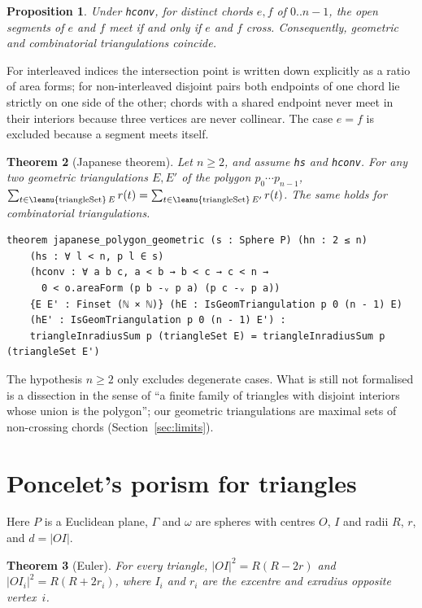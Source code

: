 \documentclass[11pt]{article}
\newtheorem{theorem}{Theorem}
\newtheorem{proposition}[theorem]{Proposition}
\theoremstyle{definition}
\theoremstyle{remark}
\DeclareRobustCommand\lean[1]{\ifmmode\text{\leanu{#1}}\else\leanu{#1}\fi}
\newcommand{\code}[1]{\texttt{#1}}
\begin{document}
\begin{proposition}\label{prop:cross}
Under \code{hconv}, for distinct chords $e,f$ of $0..n-1$, the open segments of $e$ and $f$ meet if and
only if $e$ and $f$ cross. Consequently, geometric and combinatorial triangulations coincide.
\end{proposition}

For interleaved indices the intersection point is written down explicitly as a ratio of area forms;
for non-interleaved disjoint pairs both endpoints of one chord lie strictly on one side of the
other; chords with a shared endpoint never meet in their interiors because three vertices are never
collinear. The case $e=f$ is excluded because a segment meets itself.

\begin{theorem}[Japanese theorem]\label{thm:japanese}
Let $n\ge2$, and assume \code{hs} and \code{hconv}. For any two geometric triangulations $E,E'$ of the
polygon $p_0\cdots p_{n-1}$,
$\sum_{t\in\lean{triangleSet}\,E}r(t)=\sum_{t\in\lean{triangleSet}\,E'}r(t)$. The same holds for
combinatorial triangulations.
\end{theorem}

\begin{lstlisting}
theorem japanese_polygon_geometric (s : Sphere P) (hn : 2 ≤ n)
    (hs : ∀ l < n, p l ∈ s)
    (hconv : ∀ a b c, a < b → b < c → c < n →
      0 < o.areaForm (p b -ᵥ p a) (p c -ᵥ p a))
    {E E' : Finset (ℕ × ℕ)} (hE : IsGeomTriangulation p 0 (n - 1) E)
    (hE' : IsGeomTriangulation p 0 (n - 1) E') :
    triangleInradiusSum p (triangleSet E) = triangleInradiusSum p (triangleSet E')
\end{lstlisting}

The hypothesis $n\ge2$ only excludes degenerate cases. What is still not formalised is a
dissection in the sense of ``a finite family of triangles with disjoint interiors whose union is the
polygon''; our geometric triangulations are maximal sets of non-crossing chords
(Section~\ref{sec:limits}).

\section{Poncelet's porism for triangles}\label{sec:poncelet}

Here $P$ is a Euclidean plane, $\Gamma$ and $\omega$ are spheres with centres $O$, $I$ and radii
$R$, $r$, and $d=|OI|$.

\begin{theorem}[Euler]\label{thm:euler}
For every triangle, $|OI|^2=R(R-2r)$ and $|OI_i|^2=R(R+2r_i)$, where $I_i$ and $r_i$ are the
excentre and exradius opposite vertex~$i$.
\end{theorem}
\end{document}
